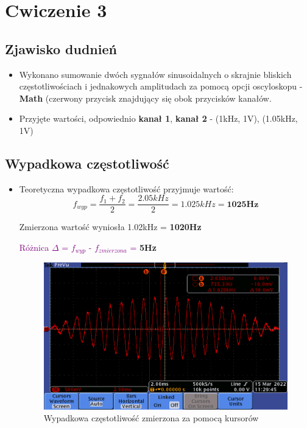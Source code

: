 \chapter{Cwiczenie 3}

\section{Zjawisko dudnień}

\begin{itemize}
    \item Wykonano sumowanie dwóch sygnałów sinusoidalnych o skrajnie bliskich częstotliwościach i jednakowych amplitudach za pomocą opcji oscyloskopu - \textbf{Math} (czerwony przycisk znajdujący się obok przycisków kanałów.
    \item Przyjęte wartości, odpowiednio \textbf{kanał 1}, \textbf{kanał 2} - (1kHz, 1V), (1.05kHz, 1V)
\end{itemize}

\section{Wypadkowa częstotliwość}

\begin{itemize}
    \item Teoretyczna wypadkowa częstotliwość przyjmuje wartość:
    \begin{equation}
        f_{wyp} = \frac{f_1 + f_2}{2} = \frac{2.05kHz}{2} = 1.025kHz = \textbf{1025Hz}
    \end{equation}
    \begin{center}
        Zmierzona wartość wyniosła 1.02kHz = \textbf{1020Hz}
    \end{center}
    \begin{center}
        \label{ad:roznica_4_2-1}
        \textcolor{purple}{Różnica $\Delta$ = $f_{wyp}$ - $f_{zmierzona}$ =} \textbf{5Hz}
    \end{center}
    \begin{figure}[h]
        \centering
        \includegraphics[scale=1.4]{images/srednia_czestotliwosc.png}
        \caption{Wypadkowa częstotliwość zmierzona za pomocą kursorów}
        \label{fig:wypadkowa}
    \end{figure}
\end{itemize}


